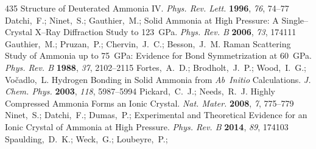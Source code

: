 \documentclass[12pt,letterpaper,oneside]{article}
\begin{document}
\begin{mcitethebibliography}{435}
    Structure of Deuterated Ammonia IV. \emph{Phys. Rev. Lett.}
  \textbf{1996}, \emph{76}, 74--77\relax
\mciteBstWouldAddEndPuncttrue
\mciteSetBstMidEndSepPunct{\mcitedefaultmidpunct}
{\mcitedefaultendpunct}{\mcitedefaultseppunct}\relax
\EndOfBibitem
{}
Datchi,~F.; Ninet,~S.; Gauthier,~M.; 
  Solid Ammonia at High Pressure: A Single--Crystal X--Ray Diffraction Study to
  123~GPa. \emph{Phys. Rev. B} \textbf{2006}, \emph{73}, 174111\relax
\mciteBstWouldAddEndPuncttrue
\mciteSetBstMidEndSepPunct{\mcitedefaultmidpunct}
{\mcitedefaultendpunct}{\mcitedefaultseppunct}\relax
\EndOfBibitem
{}
Gauthier,~M.; Pruzan,~P.; Chervin,~J.~C.; Besson,~J.~M. Raman Scattering Study
  of Ammonia up to 75~GPa: Evidence for Bond Symmetrization at 60~GPa.
  \emph{Phys. Rev. B} \textbf{1988}, \emph{37}, 2102--2115\relax
\mciteBstWouldAddEndPuncttrue
\mciteSetBstMidEndSepPunct{\mcitedefaultmidpunct}
{\mcitedefaultendpunct}{\mcitedefaultseppunct}\relax
\EndOfBibitem
{}
Fortes,~A.~D.; Brodholt,~J.~P.; Wood,~I.~G.; Vo{\v c}adlo,~L. Hydrogen Bonding
  in Solid Ammonia from \emph{Ab~Initio} Calculations. \emph{J. Chem. Phys.}
  \textbf{2003}, \emph{118}, 5987--5994\relax
\mciteBstWouldAddEndPuncttrue
\mciteSetBstMidEndSepPunct{\mcitedefaultmidpunct}
{\mcitedefaultendpunct}{\mcitedefaultseppunct}\relax
\EndOfBibitem
{}
Pickard,~C.~J.; Needs,~R.~J. Highly Compressed Ammonia Forms an Ionic Crystal.
  \emph{Nat. Mater.} \textbf{2008}, \emph{7}, 775--779\relax
\mciteBstWouldAddEndPuncttrue
\mciteSetBstMidEndSepPunct{\mcitedefaultmidpunct}
{\mcitedefaultendpunct}{\mcitedefaultseppunct}\relax
\EndOfBibitem
{}
Ninet,~S.; Datchi,~F.; Dumas,~P.; 
  Experimental and Theoretical Evidence for an Ionic Crystal of Ammonia at High
  Pressure. \emph{Phys. Rev. B} \textbf{2014}, \emph{89}, 174103\relax
\mciteBstWouldAddEndPuncttrue
\mciteSetBstMidEndSepPunct{\mcitedefaultmidpunct}
{\mcitedefaultendpunct}{\mcitedefaultseppunct}\relax
\EndOfBibitem
{}
Spaulding,~D.~K.; Weck,~G.; Loubeyre,~P.; 

\end{mcitethebibliography}
\end{document}
